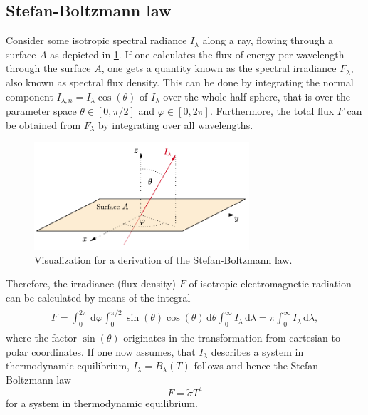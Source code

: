 \documentclass[a4paper,12pt]{report}
\begin{document}
\subsection{Stefan-Boltzmann law}
Consider some isotropic spectral radiance $I_\lambda$ along a ray, flowing through a surface $A$ as depicted in \cref{fig:isotropicrad}. If one calculates the flux of energy per wavelength through the surface $A$, one gets a quantity known as the spectral irradiance $F_\lambda$, also known as spectral flux density. This can be done by integrating the normal component $I_{\lambda,n} = I_\lambda \cos(\theta)$ of $I_\lambda$ over the whole half-sphere, that is over the parameter space $\theta \in [0,\pi/2]$ and $\varphi \in [0,2\pi]$. Furthermore, the total flux $F$ can be obtained from $F_\lambda$ by integrating over all wavelengths.
\begin{figure}[h]
\centering
\includegraphics[width=8cm]{figures/isotropicrad.pdf}
\caption{Visualization for a derivation of the Stefan-Boltzmann law.}
\label{fig:isotropicrad}
\end{figure}
Therefore, the irradiance (flux density) $F$ of isotropic electromagnetic radiation can be calculated by means of the integral \begin{align}
\begin{aligned}
F = \int_{0}^{2\pi}\,\mathrm{d}\varphi \int_{0}^{\pi/2}\sin(\theta)\cos(\theta)\,\mathrm{d}\theta \int_{0}^{\infty}I_\lambda\,\mathrm{d}\lambda = \pi\int_{0}^{\infty}I_\lambda\,\mathrm{d}\lambda,
\end{aligned}
\end{align} where the factor $\sin(\theta)$ originates in the transformation from cartesian to polar coordinates. If one now assumes, that $I_\lambda$ describes a system in thermodynamic equilibrium, $I_\lambda = B_\lambda(T)$ follows and hence the Stefan-Boltzmann law \begin{equation}
F = \tilde{\sigma}T^4
\end{equation} for a system in thermodynamic equilibrium.
\end{document}
